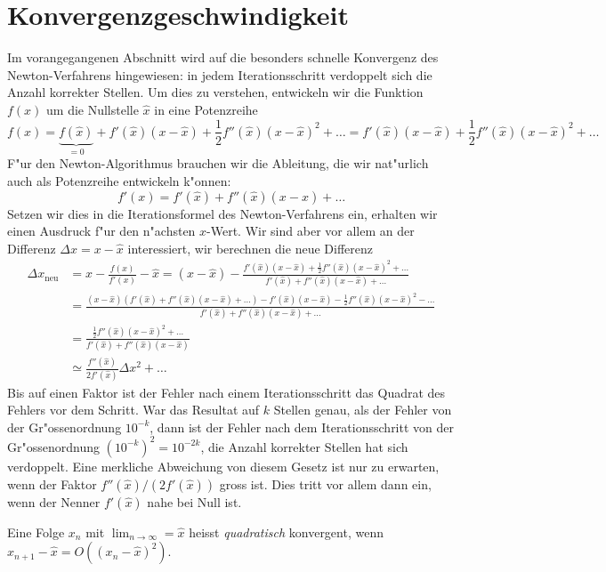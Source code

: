 \section{Konvergenzgeschwindigkeit\label{section:newton:konvergenz}}
Im vorangegangenen Abschnitt wird auf die besonders schnelle Konvergenz
des Newton-Verfahrens hingewiesen: in jedem Iterationsschritt verdoppelt
sich die Anzahl korrekter Stellen.
Um dies zu verstehen, entwickeln wir die Funktion $f(x)$ um die
Nullstelle $\hat{x}$ in eine Potenzreihe
\[
f(x)
=
\underbrace{f(\hat{x})}_{\displaystyle=0} + f'(\hat{x})(x-\hat{x})
+ \frac12 f''(\hat{x}) (x-\hat{x})^2+\dots
=
f'(\hat{x})(x-\hat{x}) + \frac12 f''(\hat{x}) (x-\hat{x})^2+\dots
\]
F"ur den Newton-Algorithmus brauchen wir die Ableitung, die wir
nat"urlich auch als Potenzreihe entwickeln k"onnen:
\[
f'(x)=f'(\hat{x})+f''(\hat{x})(x-\hat{x})+\dots
\]
Setzen wir dies in die Iterationsformel des Newton-Verfahrens ein, erhalten
wir einen Ausdruck f"ur den n"achsten $x$-Wert.
Wir sind aber vor allem an der Differenz $\Delta x=x-\hat{x}$ interessiert, wir
berechnen die neue Differenz
\begin{align*}
\Delta x_{\text{neu}}
&=
x-\frac{f(x)}{f'(x)}-\hat{x}
=
(x-\hat{x})-\frac{f'(\hat{x})(x-\hat{x}) + \frac12 f''(\hat{x}) (x-\hat{x})^2+\dots}{ f'(\hat{x})+f''(\hat{x})(x-\hat{x})+\dots}
\\
&=
\frac{
(x-\hat{x})(f'(\hat{x})+f''(\hat{x})(x-\hat{x})+\dots)
-
f'(\hat{x})(x-\hat{x}) - \frac12 f''(\hat{x}) (x-\hat{x})^2-\dots
}{f'(\hat{x})+f''(\hat{x})(x-\hat{x})+\dots}
\\
&=
\frac{\frac12f''(\hat{x})(x-\hat{x})^2+\dots}{f'(\hat{x})+f''(\hat{x})(x-\hat{x})}
\\
&\simeq \frac{f''(\hat{x})}{2f'(\hat{x})} \Delta x^2+\dots
\end{align*}
Bis auf einen Faktor ist der Fehler nach einem Iterationsschritt
das Quadrat des Fehlers vor dem Schritt.
War das Resultat auf $k$ Stellen genau, als der Fehler von der Gr"ossenordnung
$10^{-k}$, dann ist der Fehler nach dem Iterationsschritt von der
Gr"ossenordnung $(10^{-k})^2=10^{-2k}$, die Anzahl korrekter Stellen
hat sich verdoppelt.
Eine merkliche Abweichung von diesem Gesetz ist nur zu erwarten, wenn
der Faktor $f''(\hat{x})/(2f'(\hat{x}))$ gross ist.
Dies tritt vor allem dann ein, wenn der Nenner $f'(\hat{x})$
nahe bei Null ist.

\begin{definition}
Eine Folge $x_n$ mit $\lim_{n\to\infty}=\hat{x}$ heisst {\em quadratisch}
%
konvergent, wenn $x_{n+1}-\hat{x} = O((x_n-\hat{x})^2)$.
\end{definition}

